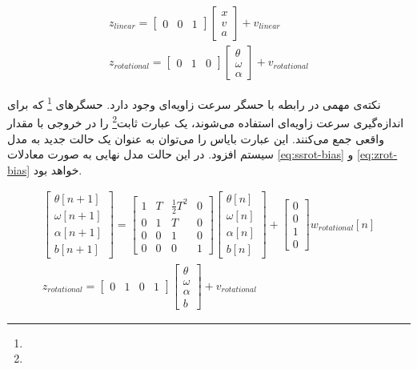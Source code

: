 \begin{gather}
	z_{linear} = 
	\begin{bmatrix}
		0 & 0 & 1
	\end{bmatrix}
	\begin{bmatrix}
		x \\
		v \\
		a
	\end{bmatrix}
	+ v_{linear} 
	\label{eq:zlin} \\
	z_{rotational} = 
	\begin{bmatrix}
		0 & 1 & 0
	\end{bmatrix}
	\begin{bmatrix}
		\theta \\
		\omega \\
		\alpha
	\end{bmatrix}
	+ v_{rotational} 
	\label{eq:zrot}
\end{gather}


نکته‌ی مهمی در رابطه با حسگر سرعت زاویه‌ای وجود دارد. حسگرهای
\footnote{}
که برای اندازه‌گیری سرعت زاویه‌ای استفاده می‌شوند، یک عبارت ثابت\footnote{} را در خروجی با مقدار واقعی جمع می‌کنند. این عبارت بایاس را می‌توان به عنوان یک حالت جدید به مدل سیستم افزود. در این حالت مدل نهایی به صورت معادلات \ref{eq:ssrot-bias} و \ref{eq:zrot-bias} خواهد بود.

\begin{gather}
	\begin{bmatrix}
		\theta[n+1] \\
		\omega[n+1] \\
		\alpha[n+1] \\
		b[n+1]
	\end{bmatrix}
	=
	\begin{bmatrix}
		1 & T & \frac{1}{2}T^2 & 0\\
		0 & 1 & T & 0\\
		0 & 0 & 1 & 0 \\
		0 & 0 & 0 & 1
	\end{bmatrix}
	\begin{bmatrix}
		\theta[n] \\
		\omega[n] \\
		\alpha[n] \\
		b[n]
	\end{bmatrix}
	+
	\begin{bmatrix}
		0 \\
		0 \\
		1 \\
		0
	\end{bmatrix}
	w_{rotational}[n]
	\label{eq:ssrot-bias} \\
	z_{rotational} = 
	\begin{bmatrix}
		0 & 1 & 0 & 1
	\end{bmatrix}
	\begin{bmatrix}
		\theta \\
		\omega \\
		\alpha \\
		b
	\end{bmatrix}
	+ v_{rotational} 
	\label{eq:zrot-bias}
\end{gather}

